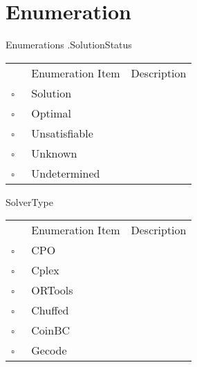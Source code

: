 \chapter{Enumeration}
Enumerations     .SolutionStatus   
\begin{longtable}{llp{8cm}}
& Enumeration Item & Description \\
$\square$\ & Solution &  \\
$\square$\ & Optimal &  \\
$\square$\ & Unsatisfiable &  \\
$\square$\ & Unknown &  \\
$\square$\ & Undetermined &  \\
\end{longtable}
SolverType   
\begin{longtable}{llp{8cm}}
& Enumeration Item & Description \\
$\square$\ & CPO &  \\
$\square$\ & Cplex &  \\
$\square$\ & ORTools &  \\
$\square$\ & Chuffed &  \\
$\square$\ & CoinBC &  \\
$\square$\ & Gecode &  \\
\end{longtable}
